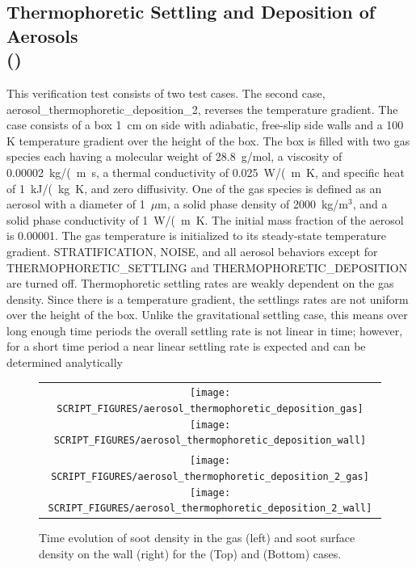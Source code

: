 \documentclass[11pt]{book}
\begin{document}
\subsection{Thermophoretic Settling and Deposition of Aerosols\\(\texorpdfstring{}{aerosol\_thermophoretic\_deposition})}
    \label{aerosol_thermophoretic_deposition}

This verification test consists of two test cases. The second case, {\ct aerosol\_thermophoretic\_deposition\_2}, reverses the temperature gradient. The case consists of a box 1~cm on side with adiabatic, free-slip side walls and a 100 K temperature gradient over the height of the box. The box is filled with two gas species each having a molecular weight of 28.8~g/mol, a viscosity of 0.00002~\si{kg/(m.s}, a thermal conductivity of 0.025~\si{W/(m.K}, and specific heat of 1~\si{kJ/(kg.K}, and zero diffusivity. One of the gas species is defined as an aerosol with a diameter of 1~$\mu$m, a solid phase density of 2000~kg/m$^3$, and a solid phase conductivity of 1~\si{W/(m.K}. The initial mass fraction of the aerosol is 0.00001. The gas temperature is initialized to its steady-state temperature gradient. {\ct STRATIFICATION}, {\ct NOISE}, and all aerosol behaviors except for {\ct THERMOPHORETIC\_SETTLING} and {\ct THERMOPHORETIC\_DEPOSITION} are turned off. Thermophoretic settling rates are weakly dependent on the gas density. Since there is a temperature gradient, the settlings rates are not uniform over the height of the box. Unlike the gravitational settling case, this means over long enough time periods the overall settling rate is not linear in time; however, for a short time period a near linear settling rate is expected and can be determined analytically

\begin{figure}[ht]
    \centering
    \begin{tabular}{c}
        \texttt{[image: SCRIPT\_FIGURES/aerosol\_thermophoretic\_deposition\_gas]}
        \texttt{[image: SCRIPT\_FIGURES/aerosol\_thermophoretic\_deposition\_wall]} \\
        \texttt{[image: SCRIPT\_FIGURES/aerosol\_thermophoretic\_deposition\_2\_gas]}
        \texttt{[image: SCRIPT\_FIGURES/aerosol\_thermophoretic\_deposition\_2\_wall]}
    \end{tabular}
    \caption[Gas phase soot densities and wall surface densities for thermophoretic deposition]{Time evolution of soot density in the gas (left) and soot surface density on the wall (right) for the  (Top) and  (Bottom) cases.}
    \label{fig:thermophoretic_deposition}
\end{figure}
\end{document}
